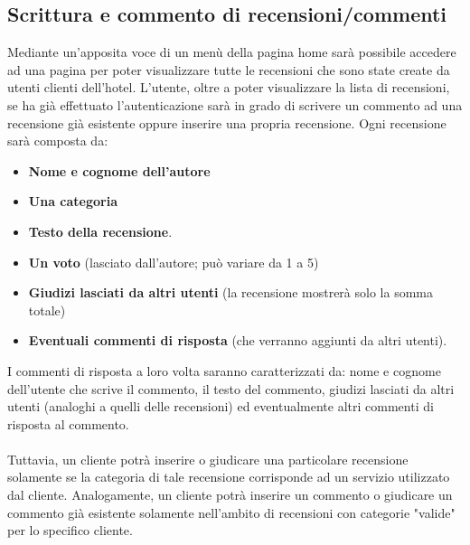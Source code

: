 \documentclass [a4paper, 12pt]{book}
\begin{document}
\subsection{Scrittura e commento di recensioni/commenti}
\label{Recensioni}
Mediante un'apposita voce di un menù della pagina home sarà possibile accedere ad una pagina per poter visualizzare tutte le recensioni che sono state create da utenti clienti dell'hotel. L'utente, oltre a poter visualizzare la lista di recensioni, se ha già effettuato l'autenticazione sarà in grado di scrivere un commento ad una recensione già esistente oppure inserire una propria recensione. Ogni recensione sarà composta da:
\begin{itemize}
\item \textbf{Nome e cognome dell'autore}
\item \textbf{Una categoria}
\item \textbf{Testo della recensione}.
\item \textbf{Un voto} (lasciato dall'autore; può variare da 1 a 5)
\item \textbf{Giudizi lasciati da altri utenti} (la recensione mostrerà solo la somma totale)
\item \textbf{Eventuali commenti di risposta} (che verranno aggiunti da altri utenti).
\end{itemize}
I commenti di risposta a loro volta saranno caratterizzati da: nome e cognome dell'utente che scrive il commento, il testo del commento, giudizi lasciati da altri utenti (analoghi a quelli delle recensioni) ed eventualmente altri commenti di risposta al commento.\\\\
Tuttavia, un cliente potrà inserire o giudicare una particolare recensione solamente se la categoria di tale recensione corrisponde ad un servizio utilizzato dal cliente. Analogamente, un cliente potrà inserire un commento o giudicare un commento già esistente solamente nell'ambito di recensioni con categorie "valide" per lo specifico cliente.

\medskip
\end{document}
